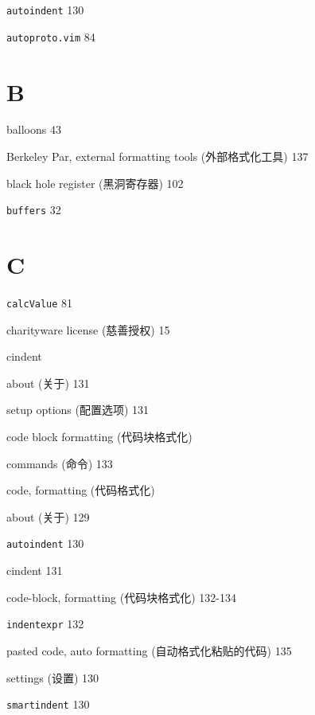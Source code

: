 \begin{multicols}{2}
\hangindent=3pc  \texttt{autoindent} 130

\hangindent=3pc  \texttt{autoproto.vim} 84

\hangindent=3pc  \section*{B}

\hangindent=3pc  balloons 43

\hangindent=3pc  Berkeley Par, external formatting tools (外部格式化工具) 137

\hangindent=3pc  black hole register (黑洞寄存器) 102

\hangindent=3pc  \texttt{buffers} 32

\hangindent=3pc  \section*{C}

\hangindent=3pc  \texttt{calcValue} 81

\hangindent=3pc  charityware license (慈善授权) 15

\hangindent=3pc  cindent \par
\hangindent=3pc \quad about (关于) 131 \par
\hangindent=3pc \quad setup options (配置选项) 131 \par

\hangindent=3pc  code block formatting (代码块格式化) \par
\hangindent=3pc \quad commands (命令) 133 \par

\hangindent=3pc  code, formatting (代码格式化) \par
\hangindent=3pc \quad about (关于) 129 \par
\hangindent=3pc \quad \texttt{autoindent} 130 \par
\hangindent=3pc \quad cindent 131 \par
\hangindent=3pc \quad code-block, formatting (代码块格式化) 132-134 \par
\hangindent=3pc \quad \texttt{indentexpr} 132 \par
\hangindent=3pc \quad pasted code, auto formatting (自动格式化粘贴的代码) 135 \par
\hangindent=3pc \quad settings (设置) 130 \par
\hangindent=3pc \quad \texttt{smartindent} 130 \par


\end{multicols}
